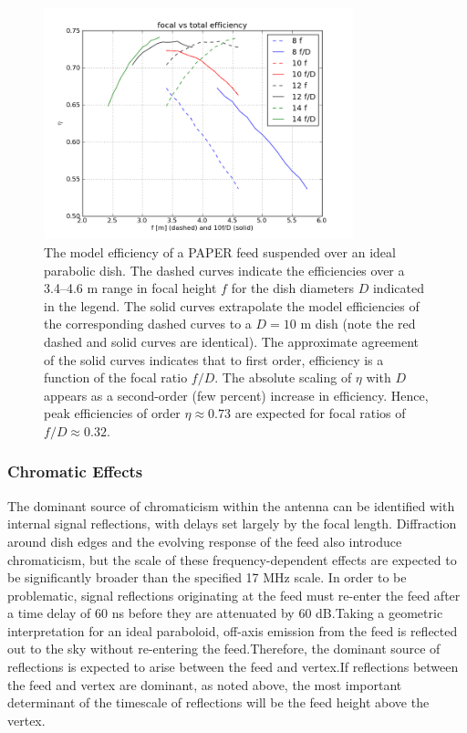 \documentclass[11pt]{article}
\begin{document}
\begin{figure}[h]
\centering
\includegraphics[width=0.8\textwidth]{heraDishfDplot.png}
\caption{The model efficiency of a PAPER feed suspended over an ideal parabolic dish.  
The dashed curves indicate the efficiencies over a 3.4--4.6 m range in focal height $f$
for the dish diameters $D$ indicated in the legend.  The solid curves extrapolate the
model efficiencies of the corresponding dashed curves to a $D=10$ m dish (note
the red dashed and solid curves are identical). The approximate agreement of the
solid curves indicates that to first order, efficiency is a function
of the focal ratio $f/D$. The absolute scaling of $\eta$ with $D$ appears as a second-order (few percent) increase in efficiency.  Hence, peak efficiencies of order $\eta\approx0.73$ are expected for
focal ratios of $f/D\approx0.32$.}
\label{fig:efficiency}
\end{figure}

\subsubsection{Chromatic Effects}
The dominant source of chromaticism within the antenna can be identified with internal signal 
reflections, with delays set largely by the focal length.  Diffraction around dish edges and the evolving 
response of the feed also introduce chromaticism, but the scale of these frequency-dependent effects 
are expected to be significantly broader than the specified 17 MHz scale.  In order to be problematic, 
signal reflections originating at the feed must re-enter the feed after a time delay of 60 ns before they 
are attenuated by 60 dB.Taking a geometric interpretation for an ideal paraboloid, off-axis emission 
from the feed is reflected out to the sky without re-entering the feed.Therefore, the dominant source of 
reflections is expected to arise between the feed and vertex.If reflections between the feed and vertex 
are dominant, as noted above, the most important determinant of the timescale of reflections will be the 
feed height above the vertex.  
\end{document}
